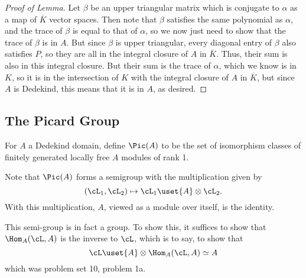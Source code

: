 \documentclass[12 pt]{article}
\theoremstyle{definition}
\begin{document}
\begin{proof}[Proof of Lemma]
Let $\beta$ be an upper triangular matrix which is conjugate to $\alpha$ as a map of $\overline{K}$ vector spaces. Then note that $\beta$ satisfies the same polynomial as $\alpha$, and the trace of $\beta$ is equal to that of $\alpha$, so we now just need to show that the trace of $\beta$ is in $A$. But since $\beta$ is upper triangular, every diagonal entry of $\beta$ also satisfies $P$, so they are all in the integral closure of $A$ in $\overline{K}$. Thus, their sum is also in this integral closure. But their sum is the trace of $\alpha$, which we know is in $K$, so it is in the intersection of $K$ with the integral closure of $A$ in $\overline{K}$, but since $A$ is Dedekind, this means that it is in $A$, as desired.



\phantom{\textbf{\textcolor[rgb]{0.98,0.00,0.00}{Perhaps there is a better way of thinking about all this that doesn't involve working with JNF and upper triangulation so much?}}}


\end{proof}







\subsection{The Picard Group}

\begin{definition}
For $A$ a Dedekind domain, define $\Pic(A)$ to be the set of isomorphism classes of finitely generated locally free $A$ modules of rank 1.
\end{definition}

Note that $\Pic(A)$ forms a semigroup with the multiplication given by
\[(\cL_1, \cL_2) \mapsto \cL_1 \uset{A}\otimes \cL_2.\]
With this multiplication, $A$, viewed as a module over itself, is the identity.

This semi-group is in fact a group. To show this, it suffices to show that $\Hom_A(\cL,A)$ is the inverse to $\cL$, which is to say, to show that
\[\cL \uset{A}\otimes \Hom_A(\cL,A) \simeq A\]
which was problem set 10, problem 1a.
\end{document}
